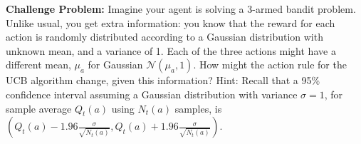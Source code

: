\textbf{Challenge Problem:} Imagine your agent is solving a 3-armed bandit problem. Unlike usual, you get extra information: you know that the reward for each action is randomly distributed according to a Gaussian distribution with unknown mean, and a variance of 1. Each of the three actions might have a different mean, $\mu_a$ for Gaussian $\mathcal{N}(\mu_{a}, 1)$. How might the action rule for the UCB algorithm change, given this information? Hint: Recall that a 95\% confidence interval assuming a Gaussian distribution with variance $\sigma = 1$, for sample average $Q_t(a)$ using $N_t(a)$ samples, is $(Q_t(a) - 1.96 \frac{\sigma}{\sqrt{N_t(a)}}, Q_t(a) + 1.96 \frac{\sigma}{\sqrt{N_t(a)}})$. 
\smallspace


